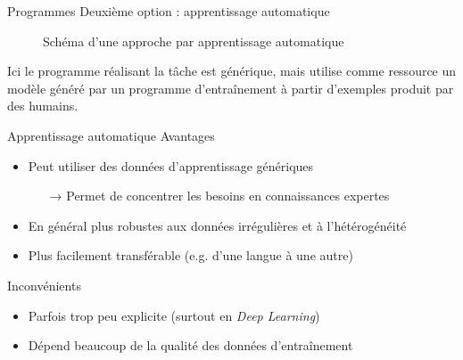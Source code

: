 \documentclass[hyperref={unicode}, xcolor={svgnames}]{beamer}
\begin{document}
\begin{frame}[fragile=singleslide]{Programmes}
    Deuxième option : apprentissage automatique
    \begin{figure}
    \caption{Schéma d'une approche par apprentissage automatique}
    \end{figure}
    Ici le \textcolor{highlight0}{programme réalisant la tâche} est générique, mais utilise comme ressource un \textcolor{highlight3}{modèle} généré par un \textcolor{highlight6}{programme d'entraînement} à partir d'\textcolor{highlight7}{exemples} produit par des humains.
\end{frame}

\begin{frame}{Apprentissage automatique}
    Avantages
    \begin{itemize}
        \item Peut utiliser des données d'apprentissage génériques
            \begin{itemize}
                \item[→] Permet de concentrer les besoins en connaissances expertes
            \end{itemize}
        \item En général plus robustes aux données irrégulières et à l'hétérogénéité
        \item Plus facilement transférable (e.g. d'une langue à une autre)
    \end{itemize}
    Inconvénients
    \begin{itemize}
        \item Parfois trop peu explicite (surtout en \textit{Deep Learning})
        \item Dépend beaucoup de la qualité des données d'entraînement
    \end{itemize}
\end{frame}
\end{document}
